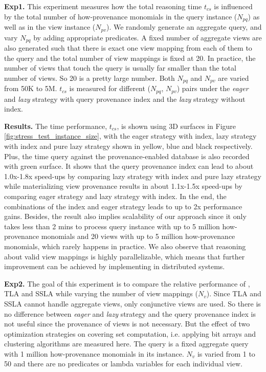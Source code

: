 \textbf{Exp1.}  This experiment measures how the total reasoning time $t_{cs}$ is influenced by the total number of how-provenance monomials in the query instance ($N_{pq}$) as well as 
in the view instance ($N_{pv}$). We randomly generate an aggregate query, and vary $N_{pq}$ by adding appropriate predicates. A fixed number of aggregate views are also generated such that there is exact one view mapping from each of them to the query and the total number of view mappings is fixed at 20.  In practice, the number of views that touch the query is usually far smaller than the total number of views. So 20 is a pretty large number. Both $N_{pq}$ and $N_{pv}$ are varied from 50K to 5M. $t_{cs}$ is measured for different ($N_{pq}$, $N_{pv}$) pairs under the {\em eager} and {\em lazy} strategy with query provenance index and the {\em lazy} strategy without index.  

\textbf{Results.} 
The time performance, $t_{cs}$, is shown using 3D surfaces in Figure \ref{fig:stress_test_instance_size}, with the eager strategy with index, lazy strategy with index and pure lazy strategy shown in yellow, blue and black respectively. Plus, the time query against the provenance-enabled database is also recorded with green surface. It shows that the query provenance index can lead to about 1.0x-1.8x speed-ups by comparing lazy strategy with index and pure lazy strategy while materializing view provenance results in about 1.1x-1.5x speed-ups by comparing eager strategy and lazy strategy with index. In the end, the combinations of the index and eager strategy leads to up to 2x performance gains. Besides, the result also implies scalability of our approach since it only takes less than 2 mins to process query instance with up to 5 million how-provenance monomials and 20 views with up to 5 million how-provenance monomials, which rarely happens in practice. We also observe that reasoning about valid view mappings is highly parallelizable, which means that further improvement can be achieved by implementing in distributed systems. 


\textbf{Exp2.} The goal of this experiment is to compare the relative performance of \provalg, TLA and SSLA while varying the number of view mappings ($N_v$). Since TLA and SSLA cannot handle aggregate views, only conjunctive views are used. So there is no difference between {\em eager} and {\em lazy} strategy and the query provenance index is not useful since the provenance of views is not necessary. But the effect of two optimization strategies on covering set computation, i.e. applying bit arrays and clustering algorithms are measured here. The query is a fixed aggregate query with 1 million how-provenance monomials in its instance. $N_v$ is varied from 1 to 50 and there are no predicates or lambda variables for each individual view. 

